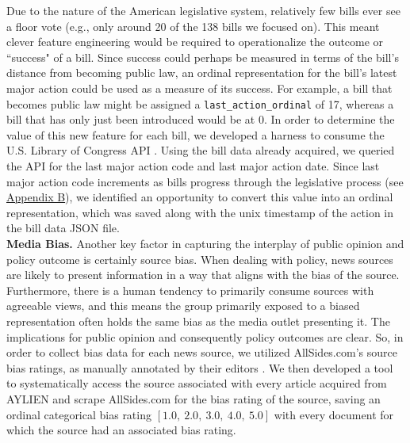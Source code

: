 \documentclass[letterpaper,11pt]{article}
\begin{document}
Due to the nature of the American legislative system, relatively few bills ever see a floor vote (e.g., only around 20 of the 138 bills we focused on). This meant clever feature engineering would be required to operationalize the outcome or ``success" of a bill. Since success could perhaps be measured in terms of the bill's distance from becoming public law, an ordinal representation for the bill's latest major action could be used as a measure of its success. For example, a bill that becomes public law might be assigned a \verb|last_action_ordinal| of 17, whereas a bill that has only just been introduced would be at 0. In order to determine the value of this new feature for each bill, we developed a harness to consume the U.S. Library of Congress API \cite{loc_api}. Using the bill data already acquired, we queried the API for the last major action code and last major action date. Since last major action code increments as bills progress through the legislative process (see \hyperref[appendix:B]{Appendix B}), we identified an opportunity to convert this value into an ordinal representation, which was saved along with the unix timestamp of the action in the bill data JSON file.\\

\textbf{Media Bias.} Another key factor in capturing the interplay of public opinion and policy outcome is certainly source bias. When dealing with policy, news sources are likely to present information in a way that aligns with the bias of the source. Furthermore, there is a human tendency to primarily consume sources with agreeable views, and this means the group primarily exposed to a biased representation often holds the same bias as the media outlet presenting it. The implications for public opinion and consequently policy outcomes are clear. So, in order to collect bias data for each news source, we utilized AllSides.com's source bias ratings, as manually annotated by their editors \cite{allsides_bias_ratings}. We then developed a tool to systematically access the source associated with every article acquired from AYLIEN and scrape AllSides.com for the bias rating of the source, saving an ordinal categorical bias rating $[1.0,\ 2.0,\ 3.0,\ 4.0,\ 5.0]$ with every document for which the source had an associated bias rating.\\
\end{document}
